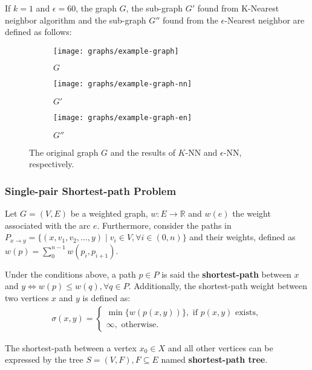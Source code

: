 \begin{example}
	If $k=1$ and $\epsilon=60$, the graph $G$, the sub-graph $G'$ found from K-Nearest neighbor algorithm and the sub-graph $G''$ found from the $\epsilon$-Nearest neighbor are defined as follows:
	\begin{figure}[H]
		\begin{subfigure}{.33\linewidth}
			\centering
			\texttt{[image: graphs/example-graph]}
			\caption{$G$}
			\label{fig:example-graph}
		\end{subfigure}%
		\begin{subfigure}{.33\linewidth}
			\centering
			\texttt{[image: graphs/example-graph-nn]}
			\caption{$G'$}
			\label{fig:example-graph-nn}
		\end{subfigure}%
		\begin{subfigure}{.33\linewidth}
			\centering
			\texttt{[image: graphs/example-graph-en]}
			\caption{$G''$}
			\label{fig:example-graph-en}
		\end{subfigure}
		\caption{The original graph $G$ and the results of $K$-NN and $\epsilon$-NN, respectively.}
	\end{figure}
\end{example}

\clearpage
\subsubsection{Single-pair Shortest-path Problem \cite{cor2011}}

Let $G=(V, E)$ be a weighted graph, $w \colon E \to \mathbb{R}$ and $w(e)$ the weight associated with the arc $e$. Furthermore, consider the paths in $P_{x \to y}=\{(x, v_1, v_2, \dots, y) \mid v_i \in V, \forall i \in (0, n)\}$ and their weights, defined as $w(p) = \sum_0^{n-1} w(p_i, p_{i+1})$.

Under the conditions above, a path $p \in P$ is said the \textbf{shortest-path} between $x$ and $y \iff w(p) \leq w(q), \forall q \in P$. Additionally, the shortest-path weight between two vertices $x$ and $y$ is defined as:
\begin{align*}
	\sigma(x, y) = \begin{cases}
		\min \{w(p(x, y))\}, \text{ if $p(x, y)$ exists}, \\
		\infty, \text{ otherwise.}
	\end{cases}
\end{align*}

The shortest-path between a vertex $x_0 \in X$ and all other vertices can be expressed by the tree $S=(V, F), F \subseteq E$ named \textbf{shortest-path tree}.

